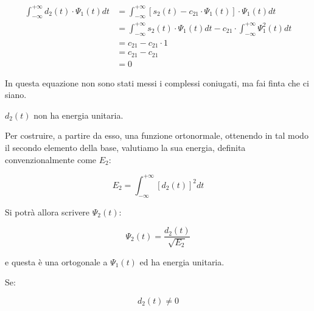 {
    \Large 
    \begin{equation}
        \begin{split}
            \int_{-\infty}^{+ \infty}
            d_2 (t)
            \cdot 
            \Psi_1 (t)
            dt 
            &= 
            \int_{-\infty}^{+ \infty}
            \left[
                s_2 (t) - c_{21} \cdot \Psi_1 (t)
            \right]
            \cdot 
            \Psi_1 (t)
            dt 
            \\
            &=
             \int_{-\infty}^{+ \infty}
            s_2 (t) 
            \cdot 
            \Psi_1 (t)
            dt 
            -
            c_{21}
            \cdot
            \int_{-\infty}^{+ \infty}
            \Psi_1 ^{2} (t)
            dt 
            \\
            &=
            c_{21} - c_{21} \cdot 1 
            \\
            &= 
            c_{21} - c_{21}
            \\
            &= 
            0
        \end{split}
    \end{equation}
}

\begin{tcolorbox}
    In questa equazione non sono stati messi i complessi coniugati, ma fai finta che ci siano.
\end{tcolorbox}

$d_2 (t)$ non ha energia unitaria. \newline 


Per costruire, a partire da esso, una funzione ortonormale, 
ottenendo in tal modo il secondo elemento della base, 
valutiamo la sua energia, definita convenzionalmente come $E_2$: 

{
    \Large 
    \begin{equation}
        E_2 = \int_{- \infty}^{+ \infty} \left[ d_2 (t) \right]^{2} dt
    \end{equation}
}

Si potrà allora scrivere $\Psi_2 (t)$: 

{
    \Large 
    \begin{equation}
        \Psi_2 (t) = \frac{d_2 (t)}{\sqrt{E_2}}
    \end{equation}
}

e questa è una ortogonale a $\Psi_1 (t)$ ed ha energia unitaria. \newline 

Se: 

{
    \Large 
    \begin{equation}
        d_2 (t) \neq 0
    \end{equation}
}

